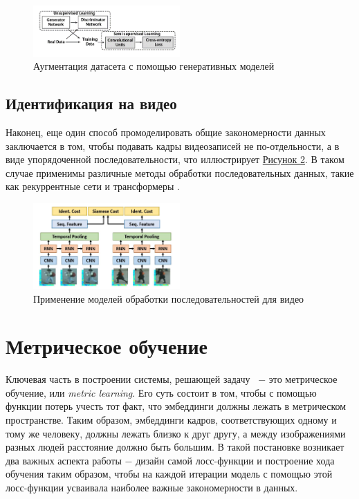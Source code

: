  \begin{figure}[ht]
     \centering
     \includegraphics[width=0.5\textwidth]{images/closed_world/dataset_augmentation.png}
     \caption{Аугментация датасета с помощью генеративных моделей \cite{zheng2017unlabeled}}
     \label{fig:dataset_augmentation}
 \end{figure}

 \subsection{Идентификация на видео}

 Наконец, еще один способ промоделировать общие закономерности данных заключается в том, чтобы подавать кадры видеозаписей не по-отдельности, а в виде упорядоченной последовательности, что иллюстрирует \hyperref[fig:rnn]{Рисунок \ref*{fig:rnn}}. В таком случае применимы различные методы обработки последовательных данных, такие как рекуррентные сети и трансформеры \cite{haque2016recurrent}.

 \begin{figure}[ht]
     \centering
     \includegraphics[width=0.5\textwidth]{images/closed_world/rnn.png}
     \caption{Применение моделей обработки последовательностей для видео \cite{haque2016recurrent}}
     \label{fig:rnn}
 \end{figure}



 \section{Метрическое обучение}

 Ключевая часть в построении системы, решающей задачу \reid\ $-$ это метрическое обучение, или \textit{metric learning}. Его суть состоит в том, чтобы с помощью функции потерь учесть тот факт, что эмбеддинги должны лежать в метрическом пространстве. Таким образом, эмбеддинги кадров, соответствующих одному и тому же человеку, должны лежать близко к друг другу, а между изображениями разных людей расстояние должно быть большим. В такой постановке возникает два важных аспекта работы $-$ дизайн самой лосс-функции и построение хода обучения таким образом, чтобы на каждой итерации модель с помощью этой лосс-функции усваивала наиболее важные закономерности в данных.


